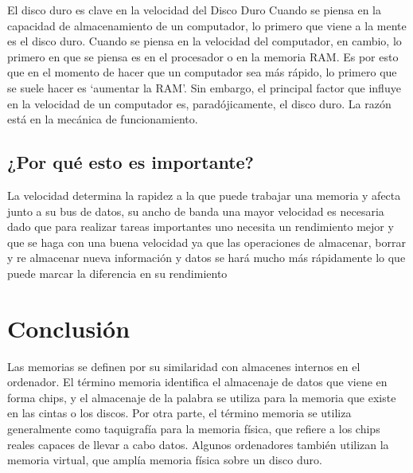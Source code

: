 \documentclass{article}
\begin{document}
El disco duro es clave en la velocidad del Disco Duro Cuando se piensa en la capacidad de almacenamiento de un computador, lo primero que viene a la mente es el disco duro. Cuando se piensa en la velocidad del computador, en cambio, lo primero en que se piensa es en el procesador o en la memoria RAM. Es por esto que en el momento de hacer que un computador sea más rápido, lo primero que se suele hacer es ‘aumentar la RAM’. Sin embargo, el principal factor que influye en la velocidad de un computador es, paradójicamente, el disco duro. La razón está en la mecánica de funcionamiento.\cite{SILO.TIPS}


\subsection{¿Por qué esto es importante?}

La velocidad determina la rapidez a la que puede trabajar una memoria y afecta junto a su bus de datos, su ancho de banda una mayor velocidad es necesaria dado que para realizar tareas importantes uno necesita un rendimiento mejor y que se haga con una buena velocidad ya que las operaciones de almacenar, borrar y re almacenar nueva información y datos se hará mucho más rápidamente lo que puede marcar la diferencia en su rendimiento



\section{Conclusión} \label{conclulsion}

Las memorias se definen por su similaridad con almacenes internos en el ordenador. El término memoria identifica el almacenaje de datos que viene en forma chips, y el almacenaje de la palabra se utiliza para la memoria que existe en las cintas o los discos. Por otra parte, el término memoria se utiliza generalmente como taquigrafía para la memoria física, que refiere a los chips reales capaces de llevar a cabo datos. Algunos ordenadores también utilizan la memoria virtual, que amplía memoria física sobre un disco duro.\cite{monografia.com}
\begin{lstlisting}
\end{lstlisting}




\end{document}

